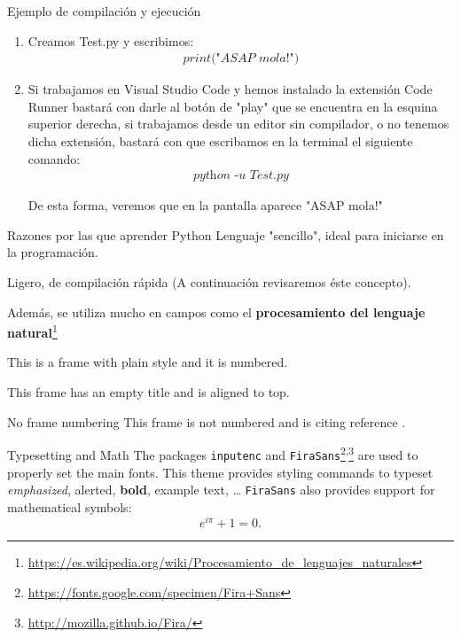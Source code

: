 \documentclass{beamer}
\begin{document}
	\begin{frame}{Ejemplo de compilación y ejecución}
	\begin{enumerate}
		\item Creamos Test.py y escribimos: 
		\begin{gather}
		\textit{print("ASAP mola!")}
		\end{gather}
		\item Si trabajamos en Visual Studio Code y hemos instalado la extensión Code Runner bastará con darle al botón de "play" que se encuentra en la esquina superior derecha, si trabajamos desde un editor sin compilador, o no tenemos dicha extensión, bastará con que escribamos en la terminal el siguiente comando:
		\begin{gather}
			\textit{python -u Test.py}
		\end{gather}
	
		De esta forma, veremos que en la pantalla aparece "ASAP mola!"
	\end{enumerate}
	\end{frame}
    \begin{frame}{Razones por las que aprender Python}
    	\setlength{\parskip}{8mm} %
        Lenguaje "sencillo", ideal para iniciarse en la programación.
        
        Ligero, de compilación rápida (A continuación revisaremos éste concepto).
        
        Además, se utiliza mucho en campos como el \textbf{procesamiento del lenguaje natural}\footnote{\url{https://es.wikipedia.org/wiki/Procesamiento_de_lenguajes_naturales}}
    \end{frame}

    \begin{frame}
        This is a frame with plain style and it is numbered.
    \end{frame}
    
    \begin{frame}[t]
        This frame has an empty title and is aligned to top.
    \end{frame}
    
    \begin{frame}[noframenumbering]{No frame numbering}
        This frame is not numbered and is citing reference \cite{knuth74}.
    \end{frame}
    
    \begin{frame}{Typesetting and Math}
        The packages \texttt{inputenc} and \texttt{FiraSans}\footnote{\url{https://fonts.google.com/specimen/Fira+Sans}}\textsuperscript{,}\footnote{\url{http://mozilla.github.io/Fira/}} are used to properly set the main fonts.
        \vfill
        This theme provides styling commands to typeset \emph{emphasized}, \alert{alerted}, \textbf{bold}, \textcolor{example}{example text}, \dots
        \vfill
        \texttt{FiraSans} also provides support for mathematical symbols:
        \begin{equation*}
            e^{i\pi} + 1 = 0.
        \end{equation*}
    \end{frame}
\end{document}
